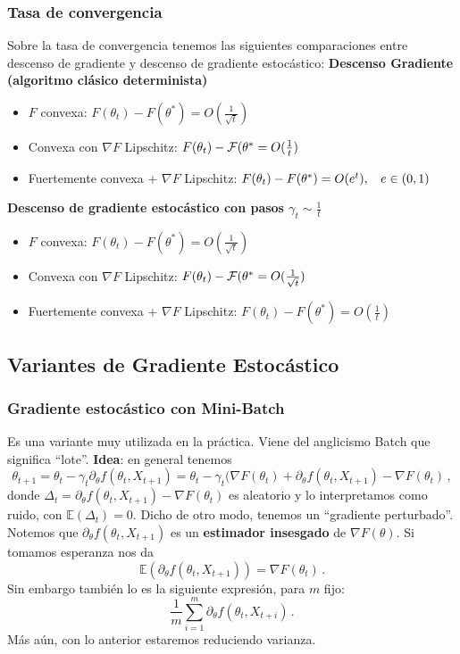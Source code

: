 \documentclass[letterpaper,11pt]{article} %
\def\espacio{\hspace{.25cm}\,}
\theoremstyle{defbreak}
\theoremstyle{propbreak}
\theoremstyle{remark}
\theoremstyle{break}
\def\E{\mathbb{E}}
\begin{document}
\subsubsection{Tasa de convergencia}
Sobre la tasa de convergencia tenemos las siguientes comparaciones entre descenso de gradiente y descenso de gradiente estocástico:
\newp \textbf{Descenso Gradiente (algoritmo clásico determinista)}
\begin{itemize}
    \item $F$ convexa: $F(\theta_t)-F(\theta^*)=O(\frac{1}{\sqrt{t}})$
    \item Convexa con $\nabla F$ Lipschitz: $F(\theta_t)-\mathcal{F}(\theta^*=O(\frac{1}{t})$
    \item Fuertemente convexa + $\nabla F$ Lipschitz: $F(\theta_t)-F(\theta^*)=O(e^t),\espacio e\in(0,1)$
\end{itemize}
\newp \textbf{Descenso de gradiente estocástico con pasos $\gamma_t\sim \frac{1}{t}$}
\begin{itemize}
    \item $F$ convexa: $F(\theta_t)-F(\theta^*)=O(\frac{1}{\sqrt{t}})$
    \item Convexa con $\nabla F$ Lipschitz: $F(\theta_t)-\mathcal{F}(\theta^*=O(\frac{1}{\sqrt{t}})$
    \item Fuertemente convexa + $\nabla F$ Lipschitz: $F(\theta_t)-F(\theta^*)=O(\frac{1}{t})$
\end{itemize}
\subsection{Variantes de Gradiente Estocástico}
\subsubsection{Gradiente estocástico con Mini-Batch}  %
Es una variante muy utilizada en la práctica. Viene del anglicismo Batch que significa ``lote''.
\newp \textbf{Idea}: en general tenemos
$$ \theta_{t+1}=\theta_t - \gamma_t \partial_\theta f(\theta_t,X_{t+1})=
\theta_t - \gamma_t (\nabla F(\theta_t)+\partial_\theta f(\theta_t,X_{t+1})-\nabla F(\theta_t)\,,$$
donde $\Delta_t=\partial_\theta f(\theta_t,X_{t+1})-\nabla F(\theta_t)$ es aleatorio y lo interpretamos como ruido, con $\E(\Delta_t)=0$. Dicho de otro modo, tenemos un ``gradiente perturbado''.
\newline Notemos que $\partial_\theta f(\theta_t,X_{t+1})$ es un \textbf{estimador insesgado} de $\nabla F(\theta)$. Si tomamos esperanza nos da
$$ \E(\partial_\theta f(\theta_t,X_{t+1}))=\nabla F(\theta_t)\,.$$
Sin embargo también lo es la siguiente expresión, para $m$ fijo:
$$ \displaystyle\frac{1}{m}\sum^m_{i=1}\partial_\theta f(\theta_t,X_{t+i})\,.$$
Más aún, con lo anterior estaremos reduciendo varianza.
\end{document}
